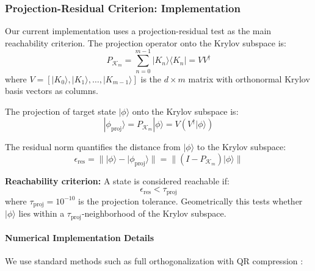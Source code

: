 \documentclass[ a4paper, 
                amsfonts, 
                amssymb, 
                amsmath, 
                reprint, 
                showkeys, 
                nofootinbib,
                superscriptaddress, 
                onecolumn, 
                notitlepage,
                aps,
                pra,
                longbibliography]{revtex4-1}
\theoremstyle{definition}
\begin{document}
\subsubsection{Projection-Residual Criterion: Implementation}

Our current implementation uses a projection-residual test as the main reachability criterion. The projection operator onto the Krylov subspace is:
\begin{equation}
P_{\mathcal{K}_m} = \sum_{n=0}^{m-1} |K_n\rangle\langle K_n| = VV^\dagger
\end{equation}
where $V = [|K_0\rangle, |K_1\rangle, \ldots, |K_{m-1}\rangle]$ is the $d \times m$ matrix with orthonormal Krylov basis vectors as columns.

The projection of target state $|\phi\rangle$ onto the Krylov subspace is:
\begin{equation}
|\phi_{\text{proj}}\rangle = P_{\mathcal{K}_m}|\phi\rangle = V(V^\dagger|\phi\rangle)
\end{equation}

The residual norm quantifies the distance from $|\phi\rangle$ to the Krylov subspace:
\begin{equation}
\epsilon_{\text{res}} = \||\phi\rangle - |\phi_{\text{proj}}\rangle\| = \|(I - P_{\mathcal{K}_m})|\phi\rangle\|
\label{eq:residual_norm}
\end{equation}

\textbf{Reachability criterion:} A state is considered reachable if:
\begin{equation}
\epsilon_{\text{res}} < \tau_{\text{proj}}
\end{equation}
where $\tau_{\text{proj}} = 10^{-10}$ is the projection tolerance. Geometrically this tests whether $|\phi\rangle$ lies within a $\tau_{\text{proj}}$-neighborhood of the Krylov subspace.

\paragraph{Numerical Implementation Details}

We use standard methods such as full orthogonalization with QR compression \cite{Rabinovici_2021}:
\end{document}
